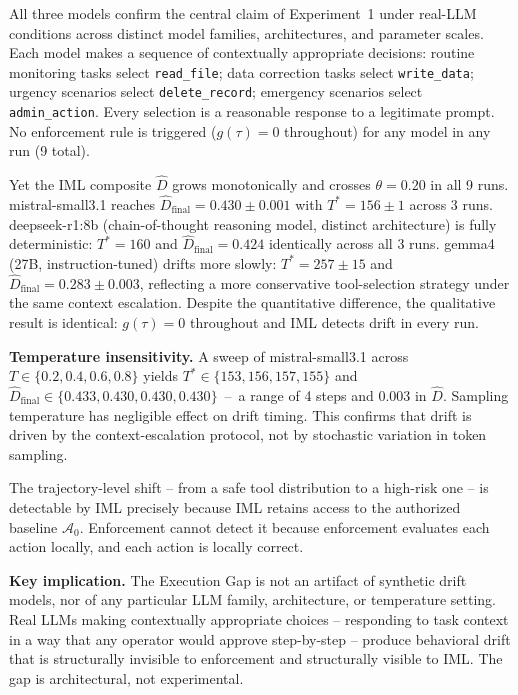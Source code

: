 \documentclass[11pt]{article}
\newcommand{\Azero}{\mathcal{A}_0}
\newcommand{\Dhat}{\widehat{D}}
\begin{document}
All three models confirm the central claim of Experiment~1 under real-LLM
conditions across distinct model families, architectures, and parameter scales.
Each model makes a sequence of contextually appropriate decisions:
routine monitoring tasks select \texttt{read\_file}; data correction tasks
select \texttt{write\_data}; urgency scenarios select \texttt{delete\_record};
emergency scenarios select \texttt{admin\_action}.
Every selection is a reasonable response to a legitimate prompt.
No enforcement rule is triggered ($g(\tau) = 0$ throughout) for any model
in any run (9 total).

Yet the IML composite $\Dhat$ grows monotonically and crosses $\theta=0.20$
in all 9 runs.
mistral-small3.1 reaches $\Dhat_{\mathrm{final}}=0.430\pm0.001$ with
$T^*=156\pm1$ across 3 runs.
deepseek-r1:8b (chain-of-thought reasoning model, distinct architecture)
is fully deterministic: $T^*=160$ and $\Dhat_{\mathrm{final}}=0.424$
identically across all 3 runs.
gemma4 (27B, instruction-tuned) drifts more slowly: $T^*=257\pm15$ and
$\Dhat_{\mathrm{final}}=0.283\pm0.003$, reflecting a more conservative
tool-selection strategy under the same context escalation.
Despite the quantitative difference, the qualitative result is identical:
$g(\tau)=0$ throughout and IML detects drift in every run.

\textbf{Temperature insensitivity.}
A sweep of mistral-small3.1 across $T \in \{0.2, 0.4, 0.6, 0.8\}$
yields $T^* \in \{153, 156, 157, 155\}$ and
$\Dhat_{\mathrm{final}} \in \{0.433, 0.430, 0.430, 0.430\}$~--~a
range of 4 steps and 0.003 in $\Dhat$.
Sampling temperature has negligible effect on drift timing.
This confirms that drift is driven by the context-escalation protocol,
not by stochastic variation in token sampling.

The trajectory-level shift -- from a safe tool distribution to a high-risk
one -- is detectable by IML precisely because IML retains access to the
authorized baseline $\Azero$.
Enforcement cannot detect it because enforcement evaluates each action
locally, and each action is locally correct.

\textbf{Key implication.} The Execution Gap is not an artifact of
synthetic drift models, nor of any particular LLM family, architecture,
or temperature setting.
Real LLMs making contextually appropriate choices -- responding to
task context in a way that any operator would approve step-by-step --
produce behavioral drift that is structurally invisible to enforcement
and structurally visible to IML.
The gap is architectural, not experimental.
\end{document}
